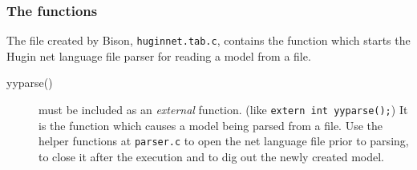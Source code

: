 \documentclass[12pt,a4paper]{report}
\begin{document}
\subsubsection{The functions}
The file created by Bison, \verb+huginnet.tab.c+, contains the
function which starts the Hugin net language file parser for reading a model
from a file.
\begin{description}
\item[yyparse()] must be included as an {\it external} function. 
(like \verb+extern int yyparse();+) It is the function which causes 
a model being parsed from a file. Use the helper functions at 
\verb+parser.c+ to open the net language file prior to parsing, to close it
after the execution and to dig out the newly created
model.
\end{description}
\end{document}
